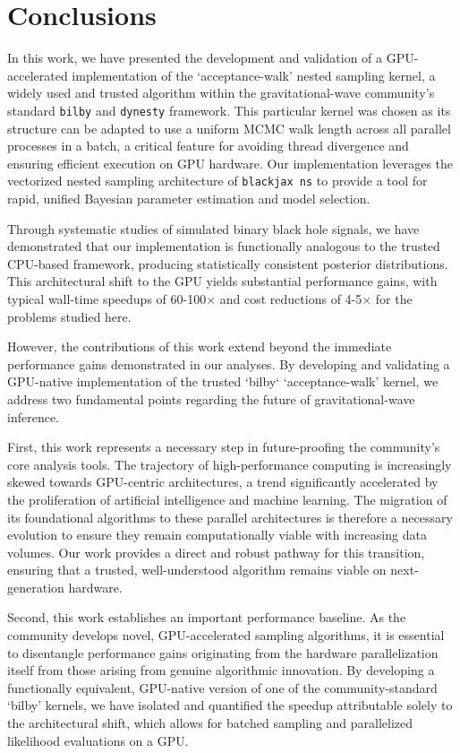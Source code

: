 \documentclass[fleqn,usenatbib]{mnras}
\begin{document}
\section{Conclusions}

In this work, we have presented the development and validation of a
GPU-accelerated implementation of the `acceptance-walk' nested sampling
kernel, a widely used and trusted algorithm within the gravitational-wave
community's standard \texttt{bilby} and \texttt{dynesty} framework. This
particular kernel was chosen as its structure can be adapted to use a
uniform MCMC walk length across all parallel processes in a batch, a
critical feature for avoiding thread divergence and ensuring efficient
execution on GPU hardware. Our implementation leverages the vectorized
nested sampling architecture of \texttt{blackjax ns} to provide a tool
for rapid, unified Bayesian parameter estimation and model selection.

Through systematic studies of simulated binary black hole signals, we have demonstrated
that our implementation is functionally analogous to the trusted
CPU-based framework, producing statistically consistent posterior
distributions. This architectural shift to the
GPU yields substantial performance gains, with typical wall-time
speedups of 60-100$\times$ and cost reductions of
4-5$\times$ for the problems studied here.

However, the contributions of this work extend beyond the immediate performance
gains demonstrated in our analyses. By developing and validating a
GPU-native implementation of the trusted `bilby` `acceptance-walk'
kernel, we address two fundamental points regarding the future of
gravitational-wave inference.

First, this work represents a necessary step in future-proofing the
community's core analysis tools. The trajectory of high-performance
computing is increasingly skewed towards GPU-centric architectures, a
trend significantly accelerated by the proliferation of artificial
intelligence and machine learning. The migration of its foundational algorithms to these parallel
architectures is therefore a necessary evolution to ensure they remain
computationally viable with increasing data volumes. Our work provides a direct
and robust pathway for this transition, ensuring that a trusted,
well-understood algorithm remains viable on next-generation hardware.

Second, this work establishes an important
performance baseline. As the community develops novel, GPU-accelerated
sampling algorithms, it is essential to disentangle performance gains
originating from the hardware parallelization itself from those arising
from genuine algorithmic innovation. By developing a functionally
equivalent, GPU-native version of one of the community-standard `bilby'
kernels, we have isolated and quantified the speedup attributable
solely to the architectural shift, which allows for batched sampling and
parallelized likelihood evaluations on a GPU.
\end{document}
